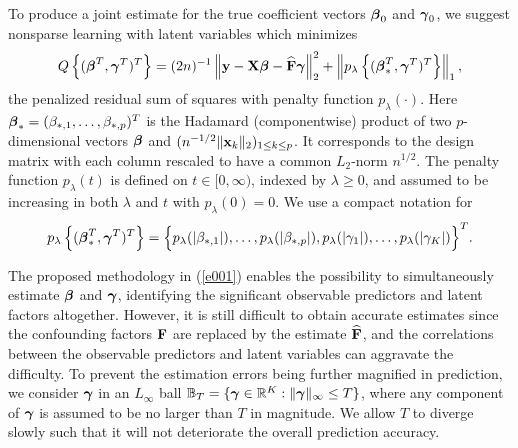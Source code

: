 \documentclass{statsoc}
\newcommand{\bx}{\mbox{\bf x}}
\newcommand{\by}{\mbox{\bf y}}
\newcommand{\bF}{\mbox{\bf F}}
\newcommand{\bX}{\mbox{\bf X}}
\newcommand{\bbeta}{\mbox{\boldmath $\beta$}}
\newcommand{\bgamma}{\mbox{\boldmath $\gamma$}}
\def\t{^T}
\begin{document}

To produce a joint estimate for the true coefficient vectors $\bbeta_0$ and $\bgamma_0$, we suggest nonsparse learning with latent variables which minimizes
\begin{equation} \label{e001}
Q\left\{(\bbeta\t, \bgamma\t)\t\right\} = (2n)^{-1} \left\|\by - \bX \bbeta - \widehat{\bF} \bgamma\right\|_2^2 + \left\|p_\lambda\left\{(\bbeta_{\ast}\t, \bgamma\t)\t\right\}\right\|_1,
\end{equation}
the penalized residual sum of squares with penalty function $p_\lambda(\cdot)$. Here $\bbeta_{\ast} = (\beta_{\ast,1}, \dots, \beta_{\ast,p})\t$ is the Hadamard (componentwise) product of two $p$-dimensional vectors $\bbeta$ and $(n^{-1/2}\|\bx_k\|_2)_{1 \leq k \leq p}$. It corresponds to the design matrix with each column rescaled to have a common $L_2$-norm $n^{1/2}$. The penalty function $p_\lambda(t)$ is defined on $t \in [0, \infty)$, indexed by $\lambda \geq 0$, and assumed to be increasing in both $\lambda$ and $t$ with $p_\lambda(0) = 0$. We use a compact notation for
\[p_\lambda \left\{(\bbeta_{\ast}\t, \bgamma\t)\t \right\} = \Big\{p_\lambda(|\beta_{\ast,1}|), \dots, p_\lambda(|\beta_{\ast,p}|), p_\lambda(|\gamma_1|), \dots, p_\lambda(|\gamma_K|) \Big\}\t.\]


The proposed methodology in (\ref{e001}) enables the possibility to simultaneously estimate $\bbeta$ and $\bgamma$, identifying the significant observable predictors and latent factors altogether. However, it is still difficult to obtain accurate estimates since the confounding factors $\bF$ are replaced by the estimate $\widehat{\bF}$, and the correlations between the observable predictors and latent variables can aggravate the difficulty. To prevent the estimation errors being further magnified in prediction, we consider $\bgamma$ in an $L_{\infty}$ ball $\mathbb{B}_T = \{\bgamma \in \mathbb{R}^K: \|\bgamma\|_{\infty} \leq T\}$, where any component of $\bgamma$ is assumed to be no larger than $T$ in magnitude. We allow $T$ to diverge slowly such that it will not deteriorate the overall prediction accuracy.
\end{document}
